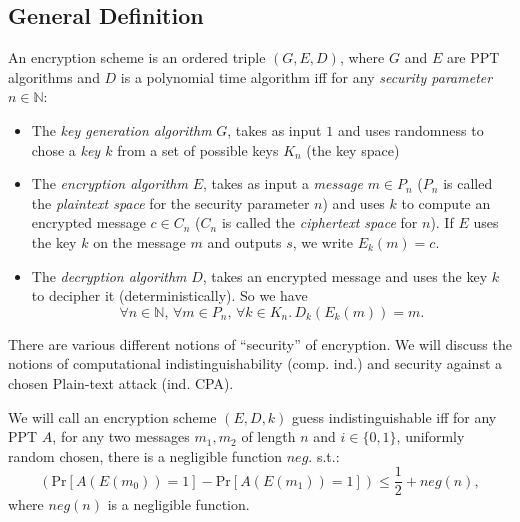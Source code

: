 \subsection{General Definition}

\begin{definition}
 An encryption scheme is an ordered triple $(G, E, D)$, where $G$ and $E$ are PPT algorithms and $D$ is a polynomial time algorithm iff for any \emph{security parameter} $n\in\mathbb{N}$:
 \begin{itemize}
  \item The \emph{key generation algorithm} $G$, takes as input $1$ and uses randomness to chose a \emph{key $k$} from a set of possible keys $K_n$ (the key space)
  \item The \emph{encryption algorithm} $E$, takes as input a \emph{message} $m\in P_n$ ($P_n$ is called the \emph{plaintext space} for the security parameter $n$) and uses $k$ to compute an encrypted message $c\in C_n$ ($C_n$ is called the \emph{ciphertext space} for $n$). If $E$ uses the key $k$ on the message $m$ and outputs $s$, we write $E_k(m)=c$.
  \item The \emph{decryption algorithm} $D$, takes an encrypted message and uses the key $k$ to decipher it (deterministically). So we have $$\forall n\in\mathbb{N},\,\forall m\in P_n,\,\forall k \in K_n.\,D_k(E_k(m))=m.$$
 \end{itemize}
\end{definition}

There are various different notions of ``security'' of encryption. We will discuss the notions of %
computational indistinguishability (comp. ind.) and security against a chosen Plain-text attack (ind. CPA). 
\begin{definition}
  We will call an encryption scheme $(E,D,k)$ guess indistinguishable iff for any PPT $A$, for any two messages $m_1, m_2$ of length $n$ and $i\in \{0,1\}$, uniformly random chosen, there is a negligible function $neg.$ s.t.:
  \[(\mathrm{Pr}\left[A(E(m_0))=1\right]-\mathrm{Pr}\left[A(E(m_1))=1\right])\leq \frac{1}{2}+neg(n), \] where $neg(n)$ is a negligible function.
\end{definition}

